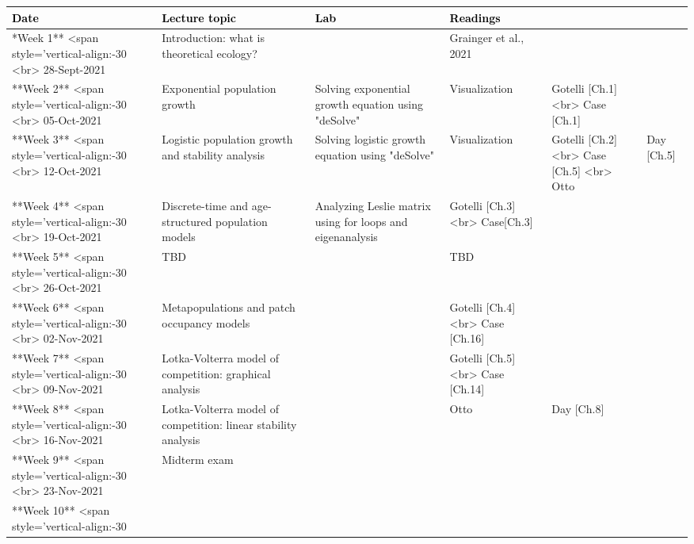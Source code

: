 \documentclass[
]{book}
\begin{document}
\begin{tabu} to 
\hline
\begingroup\fontsize{20}{22}\selectfont \textcolor{black}{\textbf{Date}}\endgroup & \begingroup\fontsize{20}{22}\selectfont \textcolor{black}{\textbf{Lecture topic}}\endgroup & \begingroup\fontsize{20}{22}\selectfont \textcolor{black}{\textbf{Lab}}\endgroup & \begingroup\fontsize{20}{22}\selectfont \textcolor{black}{\textbf{Readings}}\endgroup\\
\hline
**Week 1** <span style='vertical-align:-30%
           <br> 28-Sept-2021 & Introduction: what is theoretical ecology? & \- & Grainger et al., 2021\\
\hline
**Week 2** <span style='vertical-align:-30%
           <br> 05-Oct-2021 & Exponential population growth & Solving exponential growth equation using "deSolve" & Visualization & Gotelli [Ch.1] <br> Case [Ch.1]\\
\hline
**Week 3** <span style='vertical-align:-30%
           <br> 12-Oct-2021 & Logistic population growth and stability analysis & Solving logistic growth equation using "deSolve" & Visualization & Gotelli [Ch.2] <br> Case [Ch.5] <br> Otto & Day [Ch.5]\\
\hline
**Week 4** <span style='vertical-align:-30%
           <br> 19-Oct-2021 & Discrete-time and age-structured population models & Analyzing Leslie matrix using for loops and eigenanalysis & Gotelli [Ch.3] <br> Case[Ch.3]\\
\hline
**Week 5** <span style='vertical-align:-30%
           <br> 26-Oct-2021 & TBD &  & TBD\\
\hline
**Week 6** <span style='vertical-align:-30%
           <br> 02-Nov-2021 & Metapopulations and patch occupancy models &  & Gotelli [Ch.4] <br> Case [Ch.16]\\
\hline
**Week 7** <span style='vertical-align:-30%
           <br> 09-Nov-2021 & Lotka-Volterra model of competition: graphical analysis &  & Gotelli [Ch.5] <br> Case [Ch.14]\\
\hline
**Week 8** <span style='vertical-align:-30%
           <br> 16-Nov-2021 & Lotka-Volterra model of competition: linear stability analysis &  & Otto & Day [Ch.8]\\
\hline
**Week 9** <span style='vertical-align:-30%
           <br> 23-Nov-2021 & Midterm exam & \- & \-\\
\hline
**Week 10** <span style='vertical-align:-30%

\end{tabu}
\end{document}
